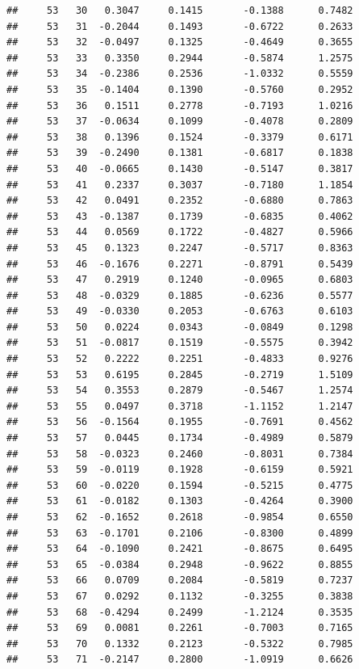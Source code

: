 \documentclass[
]{article}
\begin{document}
\begin{verbatim}
##     53   30   0.3047     0.1415       -0.1388      0.7482  
##     53   31  -0.2044     0.1493       -0.6722      0.2633  
##     53   32  -0.0497     0.1325       -0.4649      0.3655  
##     53   33   0.3350     0.2944       -0.5874      1.2575  
##     53   34  -0.2386     0.2536       -1.0332      0.5559  
##     53   35  -0.1404     0.1390       -0.5760      0.2952  
##     53   36   0.1511     0.2778       -0.7193      1.0216  
##     53   37  -0.0634     0.1099       -0.4078      0.2809  
##     53   38   0.1396     0.1524       -0.3379      0.6171  
##     53   39  -0.2490     0.1381       -0.6817      0.1838  
##     53   40  -0.0665     0.1430       -0.5147      0.3817  
##     53   41   0.2337     0.3037       -0.7180      1.1854  
##     53   42   0.0491     0.2352       -0.6880      0.7863  
##     53   43  -0.1387     0.1739       -0.6835      0.4062  
##     53   44   0.0569     0.1722       -0.4827      0.5966  
##     53   45   0.1323     0.2247       -0.5717      0.8363  
##     53   46  -0.1676     0.2271       -0.8791      0.5439  
##     53   47   0.2919     0.1240       -0.0965      0.6803  
##     53   48  -0.0329     0.1885       -0.6236      0.5577  
##     53   49  -0.0330     0.2053       -0.6763      0.6103  
##     53   50   0.0224     0.0343       -0.0849      0.1298  
##     53   51  -0.0817     0.1519       -0.5575      0.3942  
##     53   52   0.2222     0.2251       -0.4833      0.9276  
##     53   53   0.6195     0.2845       -0.2719      1.5109  
##     53   54   0.3553     0.2879       -0.5467      1.2574  
##     53   55   0.0497     0.3718       -1.1152      1.2147  
##     53   56  -0.1564     0.1955       -0.7691      0.4562  
##     53   57   0.0445     0.1734       -0.4989      0.5879  
##     53   58  -0.0323     0.2460       -0.8031      0.7384  
##     53   59  -0.0119     0.1928       -0.6159      0.5921  
##     53   60  -0.0220     0.1594       -0.5215      0.4775  
##     53   61  -0.0182     0.1303       -0.4264      0.3900  
##     53   62  -0.1652     0.2618       -0.9854      0.6550  
##     53   63  -0.1701     0.2106       -0.8300      0.4899  
##     53   64  -0.1090     0.2421       -0.8675      0.6495  
##     53   65  -0.0384     0.2948       -0.9622      0.8855  
##     53   66   0.0709     0.2084       -0.5819      0.7237  
##     53   67   0.0292     0.1132       -0.3255      0.3838  
##     53   68  -0.4294     0.2499       -1.2124      0.3535  
##     53   69   0.0081     0.2261       -0.7003      0.7165  
##     53   70   0.1332     0.2123       -0.5322      0.7985  
##     53   71  -0.2147     0.2800       -1.0919      0.6626  

\end{verbatim}
\end{document}
